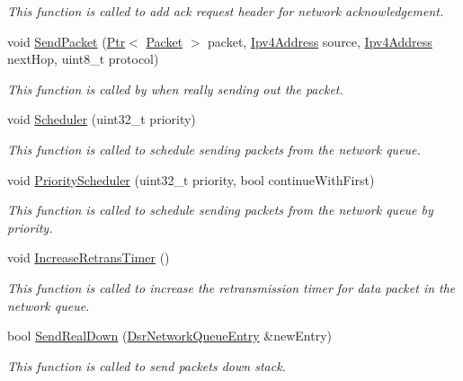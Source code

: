\begin{DoxyCompactItemize}
\begin{DoxyCompactList}\small\item\em This function is called to add ack request header for network acknowledgement. \end{DoxyCompactList}\item 
void \hyperlink{classns3_1_1dsr_1_1DsrRouting_a84a2caf24a41eef8993b64cb22874f95}{Send\+Packet} (\hyperlink{classns3_1_1Ptr}{Ptr}$<$ \hyperlink{classns3_1_1Packet}{Packet} $>$ packet, \hyperlink{classns3_1_1Ipv4Address}{Ipv4\+Address} source, \hyperlink{classns3_1_1Ipv4Address}{Ipv4\+Address} next\+Hop, uint8\+\_\+t protocol)
\begin{DoxyCompactList}\small\item\em This function is called by when really sending out the packet. \end{DoxyCompactList}\item 
void \hyperlink{classns3_1_1dsr_1_1DsrRouting_aa518edb174bccce1062304404424c6e0}{Scheduler} (uint32\+\_\+t priority)
\begin{DoxyCompactList}\small\item\em This function is called to schedule sending packets from the network queue. \end{DoxyCompactList}\item 
void \hyperlink{classns3_1_1dsr_1_1DsrRouting_aefc4dde8bd52b5b631a7ebf1d5924210}{Priority\+Scheduler} (uint32\+\_\+t priority, bool continue\+With\+First)
\begin{DoxyCompactList}\small\item\em This function is called to schedule sending packets from the network queue by priority. \end{DoxyCompactList}\item 
void \hyperlink{classns3_1_1dsr_1_1DsrRouting_aeb92858b27d37c4c593ef7f5be53dd09}{Increase\+Retrans\+Timer} ()
\begin{DoxyCompactList}\small\item\em This function is called to increase the retransmission timer for data packet in the network queue. \end{DoxyCompactList}\item 
bool \hyperlink{classns3_1_1dsr_1_1DsrRouting_a1ec646804cb4db00478cc07e51998608}{Send\+Real\+Down} (\hyperlink{classns3_1_1dsr_1_1DsrNetworkQueueEntry}{Dsr\+Network\+Queue\+Entry} \&new\+Entry)
\begin{DoxyCompactList}\small\item\em This function is called to send packets down stack. \end{DoxyCompactList}\item 

\end{DoxyCompactItemize}

